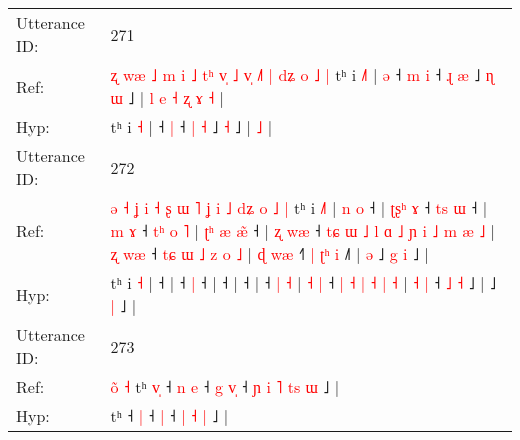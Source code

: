 \documentclass[10pt]{article}
\DeclareRobustCommand{\hl}[1]{{\textcolor{red}{#1}}}
\begin{document}
\begin{longtable}{ll}
 \\
\midrule
Utterance ID: & 271 \\
Ref: & \hl{ʐ}\hl{ }\hl{w}\hl{æ}\hl{ }\hl{˩}\hl{ }\hl{m}\hl{ }\hl{i}\hl{ }\hl{˩}\hl{ }\hl{t}\hl{ʰ}\hl{ }\hl{v}\hl{̩}\hl{ }\hl{˩}\hl{ }\hl{v}\hl{̩}\hl{ }\hl{˩}\hl{˥}\hl{ }\hl{|}\hl{ }\hl{d}\hl{ʑ}\hl{ }\hl{o}\hl{ }\hl{˩}\hl{ }\hl{|}\hl{ }tʰ i \hl{˩}\hl{˥} |\hl{ }\hl{ə} ˧\hl{ }\hl{m} \hl{i} ˧ \hl{ɻ} \hl{æ} ˩\hl{ }\hl{ɳ} \hl{ɯ} ˩ |\hl{ }\hl{l}\hl{ }\hl{e}\hl{ }\hl{˧}\hl{ }\hl{ʐ}\hl{ }\hl{ɤ} \hl{˧} |
 \\
Hyp: & \hl{}\hl{}\hl{}\hl{}\hl{}\hl{}\hl{}\hl{}\hl{}\hl{}\hl{}\hl{}\hl{}\hl{}\hl{}\hl{}\hl{}\hl{}\hl{}\hl{}\hl{}\hl{}\hl{}\hl{}\hl{}\hl{}\hl{}\hl{}\hl{}\hl{}\hl{}\hl{}\hl{}\hl{}\hl{}\hl{}\hl{}\hl{}tʰ i \hl{}\hl{˧} |\hl{}\hl{} ˧\hl{}\hl{} \hl{|} ˧ \hl{|} \hl{˧} ˩\hl{}\hl{} \hl{˧} ˩ |\hl{}\hl{}\hl{}\hl{}\hl{}\hl{}\hl{}\hl{}\hl{}\hl{} \hl{˩} |
 \\
\midrule
Utterance ID: & 272 \\
Ref: & \hl{ə}\hl{ }\hl{˧}\hl{ }\hl{ʝ}\hl{ }\hl{i}\hl{ }\hl{˧}\hl{ }\hl{ʂ}\hl{ }\hl{ɯ}\hl{ }\hl{˥}\hl{ }\hl{ʝ}\hl{ }\hl{i}\hl{ }\hl{˩}\hl{ }\hl{d}\hl{ʑ}\hl{ }\hl{o}\hl{ }\hl{˩}\hl{ }\hl{|}\hl{ }tʰ i \hl{˩}\hl{˥} |\hl{ }\hl{n}\hl{ }\hl{o} ˧ |\hl{ }\hl{ʈ}\hl{ʂ}\hl{ʰ}\hl{ }\hl{ɤ} ˧\hl{ }\hl{t}\hl{s} \hl{ɯ} ˧ |\hl{ }\hl{m}\hl{ }\hl{ɤ} ˧\hl{ }\hl{t}\hl{ʰ}\hl{ }\hl{o}\hl{ }\hl{˥} |\hl{ }\hl{ʈ}\hl{ʰ}\hl{ }\hl{æ}\hl{ }\hl{æ}\hl{̃} ˧ |\hl{ }\hl{ʐ}\hl{ }\hl{w}\hl{æ} ˧\hl{ }\hl{t}\hl{ɕ}\hl{ }\hl{ɯ}\hl{ }\hl{˩}\hl{ }\hl{l}\hl{ }\hl{ɑ}\hl{ }\hl{˩}\hl{ }\hl{ɲ}\hl{ }\hl{i}\hl{ }\hl{˩}\hl{ }\hl{m} \hl{æ} \hl{˩} | \hl{ʐ} \hl{w}\hl{æ} ˧ \hl{t}\hl{ɕ} \hl{ɯ} \hl{˩} \hl{z} \hl{o} \hl{˩} | \hl{ɖ} \hl{w}\hl{æ} ˧\hl{˥}\hl{ }\hl{|} \hl{ʈ}\hl{ʰ} \hl{i} ˩\hl{˥} |\hl{ }\hl{ə} ˩\hl{ }\hl{g} \hl{i} ˩ |
 \\
Hyp: & \hl{}\hl{}\hl{}\hl{}\hl{}\hl{}\hl{}\hl{}\hl{}\hl{}\hl{}\hl{}\hl{}\hl{}\hl{}\hl{}\hl{}\hl{}\hl{}\hl{}\hl{}\hl{}\hl{}\hl{}\hl{}\hl{}\hl{}\hl{}\hl{}\hl{}\hl{}tʰ i \hl{}\hl{˧} |\hl{}\hl{}\hl{}\hl{} ˧ |\hl{}\hl{}\hl{}\hl{}\hl{}\hl{} ˧\hl{}\hl{}\hl{} \hl{|} ˧ |\hl{}\hl{}\hl{}\hl{} ˧\hl{}\hl{}\hl{}\hl{}\hl{}\hl{}\hl{} |\hl{}\hl{}\hl{}\hl{}\hl{}\hl{}\hl{}\hl{} ˧ |\hl{}\hl{}\hl{}\hl{}\hl{} ˧\hl{}\hl{}\hl{}\hl{}\hl{}\hl{}\hl{}\hl{}\hl{}\hl{}\hl{}\hl{}\hl{}\hl{}\hl{}\hl{}\hl{}\hl{}\hl{}\hl{}\hl{} \hl{|} \hl{˧} | \hl{˧} \hl{}\hl{|} ˧ \hl{}\hl{|} \hl{˧} \hl{|} \hl{˧} \hl{|} \hl{˧} | \hl{˧} \hl{}\hl{|} ˧\hl{}\hl{}\hl{} \hl{}\hl{˩} \hl{˧} ˩\hl{} |\hl{}\hl{} ˩\hl{}\hl{} \hl{|} ˩ |
 \\
\midrule
Utterance ID: & 273 \\
Ref: & \hl{o}\hl{̃}\hl{ }\hl{˧}\hl{ }tʰ\hl{ }\hl{v}\hl{̩} ˧\hl{ }\hl{n} \hl{e} ˧\hl{ }\hl{g} \hl{v}\hl{̩} ˧\hl{ }\hl{ɲ}\hl{ }\hl{i} \hl{˥} \hl{t}\hl{s} \hl{ɯ} ˩ |
 \\
Hyp: & \hl{}\hl{}\hl{}\hl{}\hl{}tʰ\hl{}\hl{}\hl{} ˧\hl{}\hl{} \hl{|} ˧\hl{}\hl{} \hl{}\hl{|} ˧\hl{}\hl{}\hl{}\hl{} \hl{|} \hl{}\hl{˧} \hl{|} ˩ |
 \\
\midrule
\end{longtable}
\end{document}
